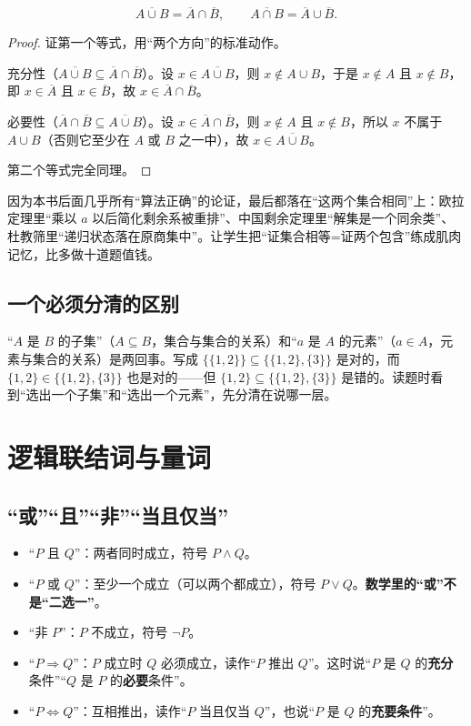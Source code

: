 \begin{theorem}[德摩根定律]
\[
\overline{A\cup B}=\overline A\cap\overline B,\qquad
\overline{A\cap B}=\overline A\cup\overline B.
\]
\end{theorem}
\begin{proof}
证第一个等式，用“两个方向”的标准动作。

充分性（$\overline{A\cup B}\subseteq\overline A\cap\overline B$）。设 $x\in\overline{A\cup B}$，则 $x\notin A\cup B$，于是 $x\notin A$ 且 $x\notin B$，即 $x\in\overline A$ 且 $x\in\overline B$，故 $x\in\overline A\cap\overline B$。

必要性（$\overline A\cap\overline B\subseteq\overline{A\cup B}$）。设 $x\in\overline A\cap\overline B$，则 $x\notin A$ 且 $x\notin B$，所以 $x$ 不属于 $A\cup B$（否则它至少在 $A$ 或 $B$ 之一中），故 $x\in\overline{A\cup B}$。

第二个等式完全同理。
\end{proof}

\begin{teach}
因为本书后面几乎所有“算法正确”的论证，最后都落在“这两个集合相同”上：欧拉定理里“乘以 $a$ 以后简化剩余系被重排”、中国剩余定理里“解集是一个同余类”、杜教筛里“递归状态落在原商集中”。让学生把“证集合相等=证两个包含”练成肌肉记忆，比多做十道题值钱。
\end{teach}

\subsection{一个必须分清的区别}
“$A$ 是 $B$ 的子集”（$A\subseteq B$，集合与集合的关系）和“$a$ 是 $A$ 的元素”（$a\in A$，元素与集合的关系）是两回事。写成 $\{\{1,2\}\}\subseteq\{\{1,2\},\{3\}\}$ 是对的，而 $\{1,2\}\in\{\{1,2\},\{3\}\}$ 也是对的——但 $\{1,2\}\subseteq\{\{1,2\},\{3\}\}$ 是错的。读题时看到“选出一个子集”和“选出一个元素”，先分清在说哪一层。

\section{逻辑联结词与量词}
\subsection{“或”“且”“非”“当且仅当”}
\begin{itemize}
\item “$P$ 且 $Q$”：两者同时成立，符号 $P\land Q$。
\item “$P$ 或 $Q$”：至少一个成立（可以两个都成立），符号 $P\lor Q$。\textbf{数学里的“或”不是“二选一”}。
\item “非 $P$”：$P$ 不成立，符号 $\lnot P$。
\item “$P\Rightarrow Q$”：$P$ 成立时 $Q$ 必须成立，读作“$P$ 推出 $Q$”。这时说“$P$ 是 $Q$ 的\textbf{充分}条件”“$Q$ 是 $P$ 的\textbf{必要}条件”。
\item “$P\iff Q$”：互相推出，读作“$P$ 当且仅当 $Q$”，也说“$P$ 是 $Q$ 的\textbf{充要条件}”。
\end{itemize}

